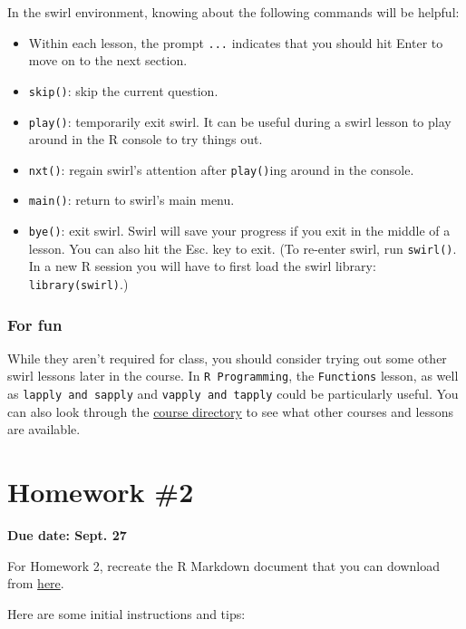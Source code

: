\documentclass[]{book}
\providecommand{\tightlist}{%
  \setlength{\itemsep}{0pt}\setlength{\parskip}{0pt}}
\theoremstyle{definition}
\theoremstyle{definition}
\theoremstyle{definition}
\theoremstyle{remark}
\begin{document}
In the swirl environment, knowing about the following commands will be
helpful:

\begin{itemize}
\tightlist
\item
  Within each lesson, the prompt \texttt{...} indicates that you should
  hit Enter to move on to the next section.
\item
  \texttt{skip()}: skip the current question.
\item
  \texttt{play()}: temporarily exit swirl. It can be useful during a
  swirl lesson to play around in the R console to try things out.
\item
  \texttt{nxt()}: regain swirl's attention after \texttt{play()}ing
  around in the console.
\item
  \texttt{main()}: return to swirl's main menu.
\item
  \texttt{bye()}: exit swirl. Swirl will save your progress if you exit
  in the middle of a lesson. You can also hit the Esc. key to exit. (To
  re-enter swirl, run \texttt{swirl()}. In a new R session you will have
  to first load the swirl library: \texttt{library(swirl)}.)
\end{itemize}

\subsubsection{For fun}\label{for-fun}

While they aren't required for class, you should consider trying out
some other swirl lessons later in the course. In
\texttt{R\ Programming}, the \texttt{Functions} lesson, as well as
\texttt{lapply\ and\ sapply} and \texttt{vapply\ and\ tapply} could be
particularly useful. You can also look through the
\href{http://swirlstats.com/scn/title.html}{course directory} to see
what other courses and lessons are available.

\section{Homework \#2}\label{homework-2}

\textbf{Due date: Sept. 27}

For Homework 2, recreate the R Markdown document that you can download
from
\href{https://github.com/geanders/RProgrammingForResearch/raw/master/Homework/Homework_2.docx}{here}.

Here are some initial instructions and tips:
\end{document}
